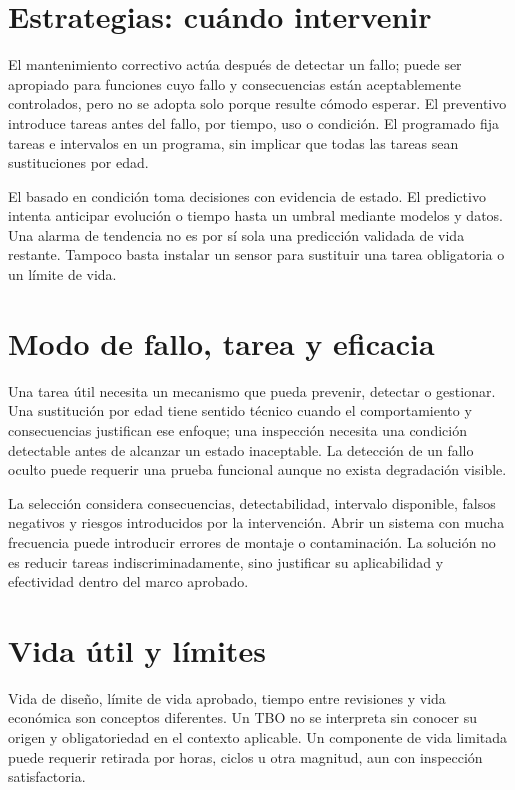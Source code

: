 \section{Estrategias: cuándo intervenir}
El mantenimiento correctivo actúa después de detectar un fallo; puede ser apropiado para funciones cuyo fallo y consecuencias están aceptablemente controlados, pero no se adopta solo porque resulte cómodo esperar. El preventivo introduce tareas antes del fallo, por tiempo, uso o condición. El programado fija tareas e intervalos en un programa, sin implicar que todas las tareas sean sustituciones por edad.

El basado en condición toma decisiones con evidencia de estado. El predictivo intenta anticipar evolución o tiempo hasta un umbral mediante modelos y datos. Una alarma de tendencia no es por sí sola una predicción validada de vida restante. Tampoco basta instalar un sensor para sustituir una tarea obligatoria o un límite de vida.
\section{Modo de fallo, tarea y eficacia}
Una tarea útil necesita un mecanismo que pueda prevenir, detectar o gestionar. Una sustitución por edad tiene sentido técnico cuando el comportamiento y consecuencias justifican ese enfoque; una inspección necesita una condición detectable antes de alcanzar un estado inaceptable. La detección de un fallo oculto puede requerir una prueba funcional aunque no exista degradación visible.

La selección considera consecuencias, detectabilidad, intervalo disponible, falsos negativos y riesgos introducidos por la intervención. Abrir un sistema con mucha frecuencia puede introducir errores de montaje o contaminación. La solución no es reducir tareas indiscriminadamente, sino justificar su aplicabilidad y efectividad dentro del marco aprobado.
\section{Vida útil y límites}
Vida de diseño, límite de vida aprobado, tiempo entre revisiones y vida económica son conceptos diferentes. Un TBO no se interpreta sin conocer su origen y obligatoriedad en el contexto aplicable. Un componente de vida limitada puede requerir retirada por horas, ciclos u otra magnitud, aun con inspección satisfactoria.

